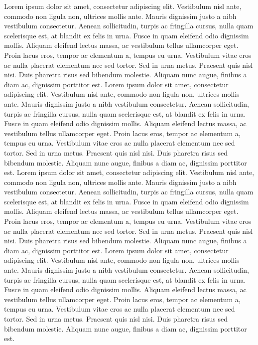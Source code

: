 Lorem ipsum dolor sit amet, consectetur adipiscing elit. Vestibulum nisl ante, commodo non ligula non, ultrices mollis ante. Mauris dignissim justo a nibh vestibulum consectetur. Aenean sollicitudin, turpis ac fringilla cursus, nulla quam scelerisque est, at blandit ex felis in urna. Fusce in quam eleifend odio dignissim mollis. Aliquam eleifend lectus massa, ac vestibulum tellus ullamcorper eget. Proin lacus eros, tempor ac elementum a, tempus eu urna. Vestibulum vitae eros ac nulla placerat elementum nec sed tortor. Sed in urna metus. Praesent quis nisl nisi. Duis pharetra risus sed bibendum molestie. Aliquam nunc augue, finibus a diam ac, dignissim porttitor est.
Lorem ipsum dolor sit amet, consectetur adipiscing elit. Vestibulum nisl ante, commodo non ligula non, ultrices mollis ante. Mauris dignissim justo a nibh vestibulum consectetur. Aenean sollicitudin, turpis ac fringilla cursus, nulla quam scelerisque est, at blandit ex felis in urna. Fusce in quam eleifend odio dignissim mollis. Aliquam eleifend lectus massa, ac vestibulum tellus ullamcorper eget. Proin lacus eros, tempor ac elementum a, tempus eu urna. Vestibulum vitae eros ac nulla placerat elementum nec sed tortor. Sed in urna metus. Praesent quis nisl nisi. Duis pharetra risus sed bibendum molestie. Aliquam nunc augue, finibus a diam ac, dignissim porttitor est.
Lorem ipsum dolor sit amet, consectetur adipiscing elit. Vestibulum nisl ante, commodo non ligula non, ultrices mollis ante. Mauris dignissim justo a nibh vestibulum consectetur. Aenean sollicitudin, turpis ac fringilla cursus, nulla quam scelerisque est, at blandit ex felis in urna. Fusce in quam eleifend odio dignissim mollis. Aliquam eleifend lectus massa, ac vestibulum tellus ullamcorper eget. Proin lacus eros, tempor ac elementum a, tempus eu urna. Vestibulum vitae eros ac nulla placerat elementum nec sed tortor. Sed in urna metus. Praesent quis nisl nisi. Duis pharetra risus sed bibendum molestie. Aliquam nunc augue, finibus a diam ac, dignissim porttitor est.
Lorem ipsum dolor sit amet, consectetur adipiscing elit. Vestibulum nisl ante, commodo non ligula non, ultrices mollis ante. Mauris dignissim justo a nibh vestibulum consectetur. Aenean sollicitudin, turpis ac fringilla cursus, nulla quam scelerisque est, at blandit ex felis in urna. Fusce in quam eleifend odio dignissim mollis. Aliquam eleifend lectus massa, ac vestibulum tellus ullamcorper eget. Proin lacus eros, tempor ac elementum a, tempus eu urna. Vestibulum vitae eros ac nulla placerat elementum nec sed tortor. Sed in urna metus. Praesent quis nisl nisi. Duis pharetra risus sed bibendum molestie. Aliquam nunc augue, finibus a diam ac, dignissim porttitor est.